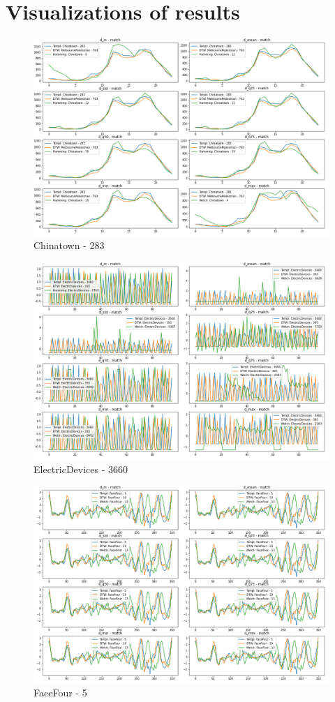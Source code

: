 \documentclass[phd,black, hidelinks]{PrincetonThesis}
\begin{document}
\chapter{Visualizations of results}
\label{sec:org6db687d}
\label{orga341cff}
\begin{figure}[htbp]
\centering
\includegraphics[width=.9\linewidth]{./img/dtw_comp_res/Chinatown_283.png}
\caption{\label{fig:org0c72bc6}Chinatown - 283}
\end{figure}

\begin{figure}[htbp]
\centering
\includegraphics[width=.9\linewidth]{./img/dtw_comp_res/ElectricDevices_3660.png}
\caption{\label{fig:orgc85fd25}ElectricDevices - 3660}
\end{figure}

\begin{figure}[htbp]
\centering
\includegraphics[width=.9\linewidth]{./img/dtw_comp_res/FaceFour_5.png}
\caption{\label{fig:org1a3bc56}FaceFour - 5}
\end{figure}
\end{document}
